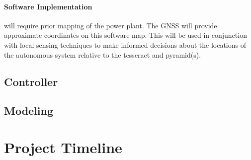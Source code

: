\documentclass[12pt]{article}
\begin{document}
\paragraph{Software Implementation} will require prior mapping of the power plant. The GNSS will provide approximate coordinates on this software map. This will be used in conjunction with local sensing techniques to make informed decisions about the locations of the autonomous system relative to the tesseract and pyramid(s).


\subsection{Controller}

\subsection{Modeling}

\clearpage
\section{Project Timeline}
\end{document}
